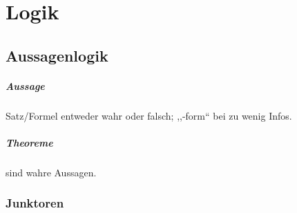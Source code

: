 \chapter{Logik}

\section{Aussagenlogik}

\paragraph{Aussage} Satz/Formel entweder wahr \linebreak oder falsch;
,,-form`` bei zu wenig Infos.

\paragraph{Theoreme} sind wahre Aussagen.

\subsection{Junktoren}

